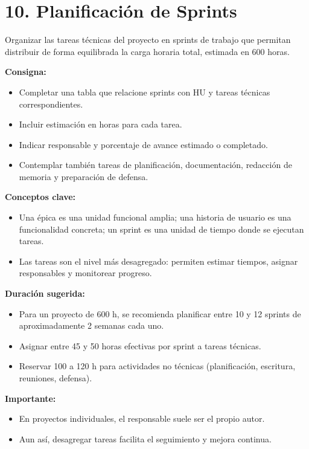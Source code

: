 \documentclass[
11pt, %
]{charter}
\begin{document}
\section{10. Planificación de Sprints}

Organizar las tareas técnicas del proyecto en sprints de trabajo que permitan distribuir de forma equilibrada la carga horaria total, estimada en 600 horas.

\textbf{Consigna:}
\begin{itemize}
  \item Completar una tabla que relacione sprints con HU y tareas técnicas correspondientes.
  \item Incluir estimación en horas para cada tarea.
  \item Indicar responsable y porcentaje de avance estimado o completado.
  \item Contemplar también tareas de planificación, documentación, redacción de memoria y preparación de defensa.
\end{itemize}

\textbf{Conceptos clave:}
\begin{itemize}
  \item Una \'{e}pica es una unidad funcional amplia; una historia de usuario es una funcionalidad concreta; un sprint es una unidad de tiempo donde se ejecutan tareas.
  \item Las tareas son el nivel más desagregado: permiten estimar tiempos, asignar responsables y monitorear progreso.
\end{itemize}

\textbf{Duración sugerida:}
\begin{itemize}
  \item Para un proyecto de 600 h, se recomienda planificar entre 10 y 12 sprints de aproximadamente 2 semanas cada uno.
  \item Asignar entre 45 y 50 horas efectivas por sprint a tareas técnicas.
  \item Reservar 100 a 120 h para actividades no técnicas (planificación, escritura, reuniones, defensa).
\end{itemize}

\textbf{Importante:}
\begin{itemize}
  \item En proyectos individuales, el responsable suele ser el propio autor.
  \item Aun así, desagregar tareas facilita el seguimiento y mejora continua.
\end{itemize}
\end{document}
